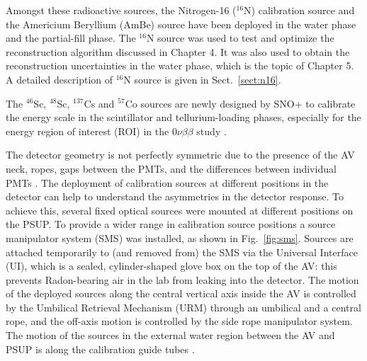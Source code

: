 Amongst these radioactive sources, the Nitrogen-16 ($^{16}$N) calibration source and the Americium Beryllium (AmBe) source have been deployed in the water phase and the partial-fill phase. The $^{16}$N source was used to test and optimize the reconstruction algorithm discussed in Chapter 4. It was also used to obtain the reconstruction uncertainties in the water phase, which is the topic of Chapter 5. A detailed description of $^{16}$N source is given in Sect.~\ref{sect:n16}. 

The $^{46}$Sc, $^{48}$Sc, $^{137}$Cs and $^{57}$Co sources are newly designed by SNO+ to calibrate the energy scale in the scintillator and tellurium-loading phases, especially for the energy region of interest (ROI) in the $0\nu\beta\beta$ study \cite{snop_jinst}. 

The detector geometry is not perfectly symmetric due to the presence of the AV neck, ropes, gaps between the PMTs, and the differences between individual PMTs \cite{snop_jinst}. The deployment of calibration sources at different positions in the detector can help to understand the asymmetries in the detector response. To achieve this, several fixed optical sources were mounted at different positions on the PSUP. To provide a wider range in calibration source positions a source manipulator system (SMS) was installed, as shown in Fig.~\ref{fig:sms}. Sources are attached temporarily to (and removed from) the SMS via the Universal Interface (UI), which is a sealed, cylinder-shaped glove box on the top of the AV: this prevents Radon-bearing air in the lab from leaking into the detector. The motion of the deployed sources along the central vertical axis inside the AV is controlled by the Umbilical Retrieval Mechanism (URM) through an umbilical and a central rope, and the off-axis motion is controlled by the side rope manipulator system. The motion of the sources in the external water region between the AV and PSUP is along the calibration guide tubes \cite{snop_jinst}.

